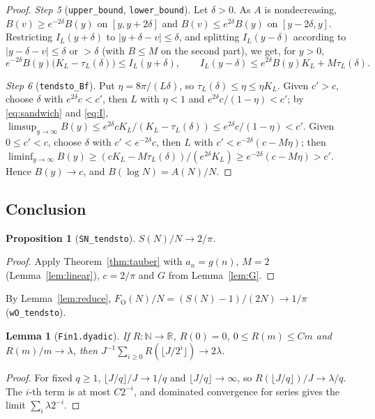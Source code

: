 \documentclass[11pt]{amsart}
\theoremstyle{plain}
\newtheorem{lemma}[theorem]{Lemma}
\newtheorem{proposition}[theorem]{Proposition}
\theoremstyle{definition}
\newcommand{\code}[1]{\texttt{#1}}
\newcommand{\N}{\mathbb{N}}
\newcommand{\R}{\mathbb{R}}
\newcommand{\FO}{F_{\mathrm O}}
\begin{document}
\begin{proof}
\emph{Step 5} (\code{upper\_bound}, \code{lower\_bound}). Let $\delta>0$. As $A$ is nondecreasing, $B(v)\ge e^{-2\delta}B(y)$ on $[y,y+2\delta]$ and $B(v)\le e^{2\delta}B(y)$ on $[y-2\delta,y]$. Restricting $I_L(y+\delta)$ to $|y+\delta-v|\le\delta$, and splitting $I_L(y-\delta)$ according to $|y-\delta-v|\le\delta$ or $>\delta$ (with $B\le M$ on the second part), we get, for $y>0$,
\begin{equation}\label{eq:sandwich}
  e^{-2\delta}B(y)\bigl(K_L-\tau_L(\delta)\bigr)\le I_L(y+\delta),\qquad I_L(y-\delta)\le e^{2\delta}B(y)K_L+M\tau_L(\delta).
\end{equation}

\emph{Step 6} (\code{tendsto\_Bf}). Put $\eta=8\pi/(L\delta)$, so $\tau_L(\delta)\le\eta\le\eta K_L$. Given $c'>c$, choose $\delta$ with $e^{2\delta}c<c'$, then $L$ with $\eta<1$ and $e^{2\delta}c/(1-\eta)<c'$; by \eqref{eq:sandwich} and \eqref{eq:I}, $\limsup_{y\to\infty}B(y)\le e^{2\delta}cK_L/(K_L-\tau_L(\delta))\le e^{2\delta}c/(1-\eta)<c'$. Given $0\le c'<c$, choose $\delta$ with $c'<e^{-2\delta}c$, then $L$ with $c'<e^{-2\delta}(c-M\eta)$; then $\liminf_{y\to\infty}B(y)\ge(cK_L-M\tau_L(\delta))/(e^{2\delta}K_L)\ge e^{-2\delta}(c-M\eta)>c'$. Hence $B(y)\to c$, and $B(\log N)=A(N)/N$.
\end{proof}

\subsection{Conclusion}

\begin{proposition}[\code{SN\_tendsto}]\label{prop:S}
$S(N)/N\to2/\pi$.
\end{proposition}

\begin{proof}
Apply Theorem~\ref{thm:tauber} with $a_n=g(n)$, $M=2$ (Lemma~\ref{lem:linear}), $c=2/\pi$ and $G$ from Lemma~\ref{lem:G}.
\end{proof}

By Lemma~\ref{lem:reduce}, $\FO(N)/N=(S(N)-1)/(2N)\to1/\pi$ (\code{wO\_tendsto}).

\begin{lemma}[\code{Fin1.dyadic}]\label{lem:dyadic}
If $R:\N\to\R$, $R(0)=0$, $0\le R(m)\le Cm$ and $R(m)/m\to\lambda$, then $J^{-1}\sum_{i\ge0}R(\lfloor J/2^i\rfloor)\to2\lambda$.
\end{lemma}

\begin{proof}
For fixed $q\ge1$, $\lfloor J/q\rfloor/J\to1/q$ and $\lfloor J/q\rfloor\to\infty$, so $R(\lfloor J/q\rfloor)/J\to\lambda/q$. The $i$-th term is at most $C2^{-i}$, and dominated convergence for series gives the limit $\sum_i\lambda2^{-i}$.
\end{proof}
\end{document}
